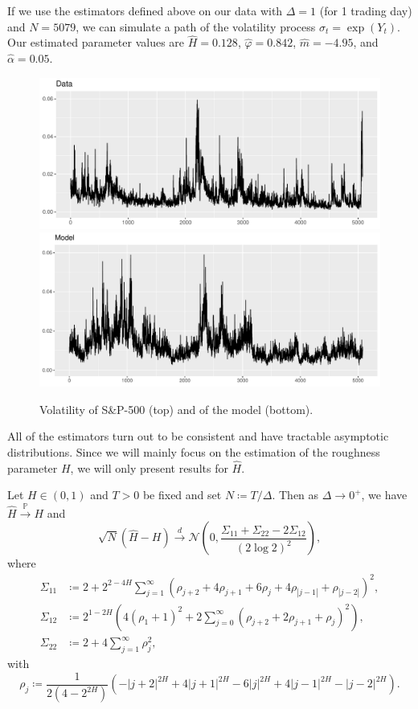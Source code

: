 If we use the estimators defined above on our data with $\Delta=1$ (for 1 trading day) and $N=5079$, we can simulate a path of the volatility process $\sigma_{t}=\exp(Y_{t})$. Our estimated parameter values are $\hat{H}=0.128$, $\hat{\varphi}=0.842$, $\hat{m} = -4.95$, and $\hat{\alpha} = 0.05$.
\begin{figure}[H]
    \centering
    \includegraphics[scale=0.65]{fig/img/RealizedLib/RealizedVolWithoutDates.pdf}
    \includegraphics[scale=0.6]{fig/img/RealizedLib/simulated_vol_ny.pdf}
    \caption{Volatility of S\&P-500 (top) and of the model (bottom).}
    \label{fig:datavol_modelvol}
\end{figure}
All of the estimators turn out to be consistent and have tractable asymptotic distributions. Since we will mainly focus on the estimation of the roughness parameter $H$, we will only present results for $\hat{H}$.
\begin{thm}\label{thm:asymp}
    Let $H\in (0,1)$ and $T>0$ be fixed and set $N\coloneqq T/\Delta$. Then as $\Delta\to 0^{+}$, we have $\hat{H}\overset{\mathbb{P}}{\to} H$ and 
    \begin{equation}
        \sqrt{N}(\hat{H}-H)\overset{d}{\to}\mathcal{N}\left(0,\frac{\Sigma_{11}+\Sigma_{22}-2\Sigma_{12}}{(2\log 2)^2}\right),
    \end{equation}
    where 
    \begin{align}
        \Sigma_{11} &\coloneqq 2 + 2^{2-4H}\sum_{j=1}^{\infty}\left(\rho_{j+2}+4\rho_{j+1}+6\rho_{j} + 4\rho_{|j-1|}+ \rho_{|j-2|}\right)^{2},\\
        \Sigma_{12}&\coloneqq 2^{1-2H}\left(4(\rho_{1}+1)^{2}+2\sum_{j=0}^{\infty}(\rho_{j+2}+2\rho_{j+1}+\rho_{j})^{2}\right),\\
        \Sigma_{22}&\coloneqq 2+4\sum_{j=1}^{\infty}\rho_{j}^{2},
    \end{align}
with 
\begin{equation}
    \rho_{j}\coloneqq \frac{1}{2(4-2^{2H})}\left(-|j+2|^{2H} + 4|j+1|^{2H} - 6|j|^{2H} + 4|j-1|^{2H} - |j-2|^{2H}\right).
\end{equation}
\end{thm}
